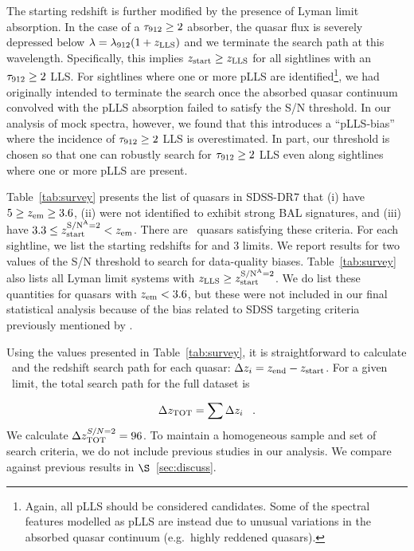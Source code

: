 \documentclass[12pt,preprint]{aastex}
\begin{document}
The starting redshift is further modified by the presence 
of Lyman limit absorption.  In the case of a $\tau_{\rm 912} \ge 2$ absorber,
the quasar flux is severely depressed below $\lambda = \lambda_{\rm 912} (1+z_{\rm LLS})$
and we terminate the search path at this wavelength.  
Specifically, this implies $z_{\rm start} \ge z_{\rm LLS}$ for all
sightlines with an $\tau_{\rm 912} \ge 2$ LLS.
For sightlines where one or more pLLS are identified\footnote{Again,
all pLLS should be considered candidates.  Some of the spectral
features modelled as pLLS are instead due to unusual variations
in the absorbed quasar continuum (e.g.\ highly reddened quasars).}, 
we had originally intended to terminate the search once the absorbed 
quasar continuum convolved with the pLLS absorption failed to satisfy
the S/N threshold.  In our analysis of mock spectra, 
however,  we found that this introduces a ``pLLS-bias'' where the
incidence of $\tau_{\rm 912} \ge 2$ LLS is overestimated.
In part, our  threshold is chosen so that one can 
robustly search for $\tau_{\rm 912} \ge 2$ LLS even along sightlines where
one or more pLLS are present.  

Table~\ref{tab:survey} presents the list of quasars in SDSS-DR7
that 
(i) have $5 \ge z_{\rm em} \ge 3.6$, 
(ii) were not identified to
exhibit strong BAL signatures, and 
(iii) have $3.3 \le z_{\rm start}^{\rm S/N^A=2} < z_{\rm em}$.
There are \nstatqso\ quasars satisfying these criteria.
For each sightline, we list the starting redshifts for
 and 3 limits.
We report results for two values of the S/N threshold to
search for data-quality biases. 
Table~\ref{tab:survey} also lists all Lyman limit systems
with $z_{\rm LLS} \ge z_{\rm start}^{\rm S/N^A=2}$.  
We do list these quantities for quasars with $z_{\rm em} < 3.6$,
but these were not included in our final statistical analysis
because of the bias related to SDSS targeting criteria
previously mentioned by \citep{pwo09}.

Using the values presented in Table~\ref{tab:survey}, it is
straightforward to calculate \zend\ and the redshift search
path for each quasar: $\Delta z_i = z_{\rm end} - z_{\rm start}$.  For
a given \sna\ limit, the total search path for the full dataset is 

\begin{equation}
\Delta z_{\rm TOT} = \sum\limits \Delta z_i  \;\;\; .
\end{equation}
We calculate $\Delta z_{\rm TOT}^{S/N=2} = 96$.
To maintain a homogeneous sample and set of search criteria,
we do not include previous studies in our analysis.
We compare against previous results in $\S$~\ref{sec:discuss}.
\end{document}

